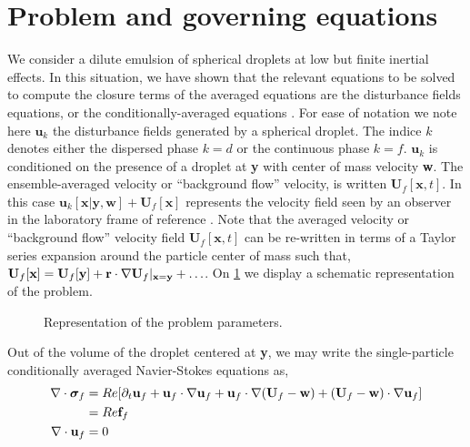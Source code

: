 \section{Problem and governing equations}
We consider a dilute emulsion of spherical droplets at low but finite inertial effects. 
In this situation, we have shown that the relevant equations to be solved to compute the closure terms of the averaged equations are the disturbance fields equations, or the conditionally-averaged equations \citep{fintzi2025}. 
For ease of notation we note here $\textbf{u}_k$ the disturbance fields generated by a spherical droplet.  
The indice $k$ denotes either the dispersed phase $k = d$ or the continuous phase $k=f$. 
$\textbf{u}_k$ is conditioned on the presence of a droplet at \textbf{y} with center of mass velocity \textbf{w}.
The ensemble-averaged velocity or ``background flow'' velocity, is written $\textbf{U}_f[\textbf{x},t]$. 
In this case $\textbf{u}_k[\textbf{x}|\textbf{y},\textbf{w}] + \textbf{U}_f[\textbf{x}]$ represents the velocity field seen by an observer in the laboratory frame of reference .
Note that the averaged velocity or ``background flow'' velocity field $\textbf{U}_f[\textbf{x},t]$ can be re-written in terms of a Taylor series expansion around the particle center of mass such that, $\textbf{U}_f[\textbf{x}] = \textbf{U}_f[\textbf{y}] + \textbf{r} \cdot \mathbf{\nabla} \textbf{U}_f|_{\textbf{x} =\textbf{y}} + \ldots$. 
On \ref{fig:disturbance} we display a schematic representation of the problem. 
\begin{figure}
    \centering
    \caption{Representation of the problem parameters.}
    \label{fig:disturbance}
\end{figure}
Out of the volume of the droplet centered at \textbf{y}, we may write the single-particle conditionally averaged Navier-Stokes equations as,  
\begin{align*}
    \mathbf{\nabla}\cdot\bm\sigma_f
    &= 
    Re [
    \partial_t \textbf{u}_f
    + \textbf{u}_f\cdot \mathbf{\nabla} \textbf{u}_f
    + \textbf{u}_f\cdot \mathbf{\nabla} (\textbf{U}_f - \textbf{w})
    + (\textbf{U}_f - \textbf{w})\cdot \mathbf{\nabla} \textbf{u}_f]\\
    &= Re \textbf{f}_f\\
    \mathbf{\nabla}\cdot \textbf{u}_f &= 0
\end{align*}

